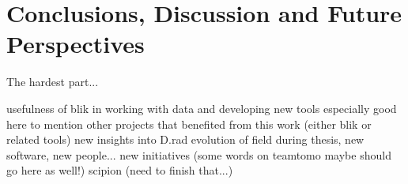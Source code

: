 \chapter{Conclusions, Discussion and Future Perspectives}

The hardest part...

\begin{outline}
\1 usefulness of blik in working with data and developing new tools
    \2 especially good here to mention other projects that benefited from this work (either blik or related tools)
\1 new insights into D.rad
\1 evolution of field during thesis, new software, new people... new initiatives (some words on teamtomo maybe should go here as well!)
\1 scipion (need to finish that...)

\end{outline}

